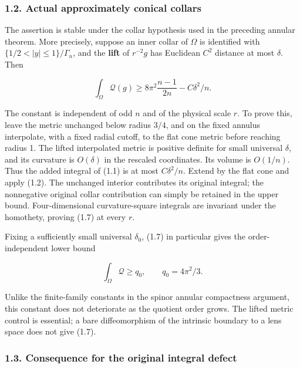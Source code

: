 \documentclass[
  10pt,
]{article}
\begin{document}
\hypertarget{actual-approximately-conical-collars}{%
\subsubsection{1.2. Actual approximately conical
collars}\label{actual-approximately-conical-collars}}

The assertion is stable under the collar hypothesis used in the
preceding annular theorem. More precisely, suppose an inner collar of
\(\Omega\) is identified with \(\{1/2<|y|\le1\}/\Gamma_n\), and the
\textbf{lift} of \(r^{-2}g\) has Euclidean \(C^2\) distance at most
\(\delta\). Then

\[
 \boxed{\int_\Omega\mathscr Q(g)
          \ge 8\pi^2\frac{n-1}{2n}-C\delta^2/n.}
                                                        \tag{1.7}
\]

The constant is independent of odd \(n\) and of the physical scale
\(r\). To prove this, leave the metric unchanged below radius \(3/4\),
and on the fixed annulus interpolate, with a fixed radial cutoff, to the
flat cone metric before reaching radius 1. The lifted interpolated
metric is positive definite for small universal \(\delta\), and its
curvature is \(O(\delta)\) in the rescaled coordinates. Its volume is
\(O(1/n)\). Thus the added integral of (1.1) is at most \(C\delta^2/n\).
Extend by the flat cone and apply (1.2). The unchanged interior
contributes its original integral; the nonnegative original collar
contribution can simply be retained in the upper bound. Four-dimensional
curvature-square integrals are invariant under the homothety, proving
(1.7) at every \(r\).

Fixing a sufficiently small universal \(\delta_0\), (1.7) in particular
gives the order-independent lower bound

\[
                  \int_\Omega\mathscr Q\ge q_0,
                  \qquad q_0=4\pi^2/3.              \tag{1.8}
\]

Unlike the finite-family constants in the spinor annular compactness
argument, this constant does not deteriorate as the quotient order
grows. The lifted metric control is essential; a bare diffeomorphism of
the intrinsic boundary to a lens space does not give (1.7).

\hypertarget{consequence-for-the-original-integral-defect}{%
\subsubsection{1.3. Consequence for the original integral
defect}\label{consequence-for-the-original-integral-defect}}
\end{document}
